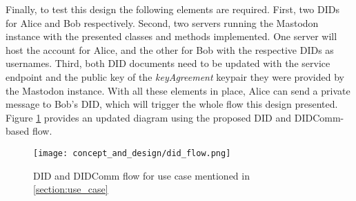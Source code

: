 Finally, to test this design the following elements are required. First, two DIDs for Alice and Bob respectively. Second, two servers running the Mastodon instance with the presented classes and methods implemented. One server will host the account for Alice, and the other for Bob with the respective DIDs as usernames. Third, both DID documents need to be updated with the service endpoint and the public key of the \emph{keyAgreement} keypair they were provided by the Mastodon instance. With all these elements in place, Alice can send a private message to Bob's DID, which will trigger the whole flow this design presented. Figure \ref{fig:did_flow} provides an updated diagram using the proposed DID and DIDComm-based flow. 

\begin{figure}[h]
  \centering
  \texttt{[image: concept\_and\_design/did\_flow.png]}
  \caption{DID and DIDComm flow for use case mentioned in \ref{section:use_case}}
  \label{fig:did_flow}
\end{figure}












